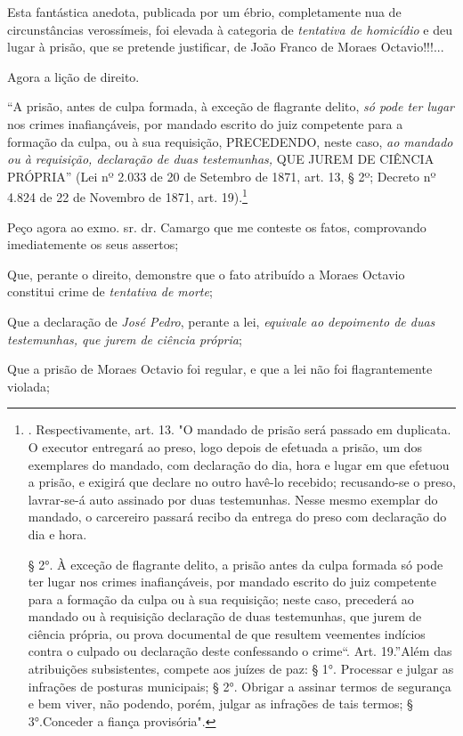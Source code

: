 Esta fantástica anedota, publicada por um ébrio, completamente nua de
circunstâncias verossímeis, foi elevada à categoria de \emph{tentativa
de homicídio} e deu lugar à prisão, que se pretende justificar, de João
Franco de Moraes Octavio!!!...

Agora a lição de direito.

``A prisão, antes de culpa formada, à exceção de flagrante delito,
\emph{só pode ter lugar} nos crimes inafiançáveis, por mandado escrito
do juiz competente para a formação da culpa, ou à sua requisição,
PRECEDENDO, neste caso, \emph{ao mandado ou à requisição, declaração de
duas testemunhas,} QUE JUREM DE CIÊNCIA PRÓPRIA'' (Lei nº 2.033 de 20 de
Setembro de 1871, art. 13, § 2º; Decreto nº 4.824 de 22 de Novembro de
1871, art. 19).\footnote{. Respectivamente, art. 13. "O mandado de
  prisão será passado em duplicata. O executor entregará ao preso, logo
  depois de efetuada a prisão, um dos exemplares do mandado, com
  declaração do dia, hora e lugar em que efetuou a prisão, e exigirá que
  declare no outro havê-lo recebido; recusando-se o preso, lavrar-se-á
  auto assinado por duas testemunhas. Nesse mesmo exemplar do mandado, o
  carcereiro passará recibo da entrega do preso com declaração do dia e
  hora.

  § 2°. À exceção de flagrante delito, a prisão antes da culpa formada
  só pode ter lugar nos crimes inafiançáveis, por mandado escrito do
  juiz competente para a formação da culpa ou à sua requisição; neste
  caso, precederá ao mandado ou à requisição declaração de duas
  testemunhas, que jurem de ciência própria, ou prova documental de que
  resultem veementes indícios contra o culpado ou declaração deste
  confessando o crime``. Art. 19.''Além das atribuições subsistentes,
  compete aos juízes de paz: § 1°. Processar e julgar as infrações de
  posturas municipais; § 2°. Obrigar a assinar termos de segurança e bem
  viver, não podendo, porém, julgar as infrações de tais termos; §
  3°.Conceder a fiança provisória".}

Peço agora ao exmo. sr. dr. Camargo que me conteste os fatos,
comprovando imediatemente os seus assertos;

Que, perante o direito, demonstre que o fato atribuído a Moraes Octavio
constitui crime de \emph{tentativa de morte};

Que a declaração de \emph{José Pedro}, perante a lei, \emph{equivale ao
depoimento de duas testemunhas, que jurem de ciência própria};

Que a prisão de Moraes Octavio foi regular, e que a lei não foi
flagrantemente violada;

